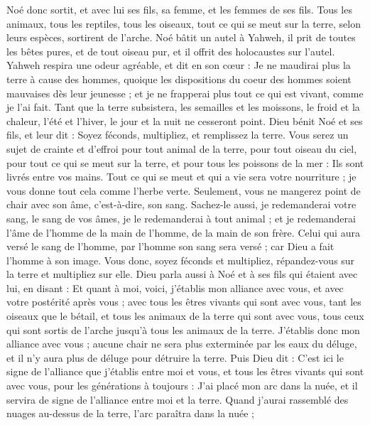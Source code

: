 \begin{multicols}{2}
Noé donc sortit, et avec lui ses fils, sa femme, et les femmes de ses fils.
Tous les animaux, tous les reptiles, tous les oiseaux, tout ce qui se meut sur la terre, selon leurs espèces, sortirent de l'arche.
Noé bâtit un autel à Yahweh, il prit de toutes les bêtes pures, et de tout oiseau pur, et il offrit des holocaustes sur l'autel.
Yahweh respira une odeur agréable, et dit en son cœur : Je ne maudirai plus la terre à cause des hommes, quoique les dispositions du coeur des hommes soient mauvaises dès leur jeunesse ; et je ne frapperai plus tout ce qui est vivant, comme je l’ai fait.
Tant que la terre subsistera, les semailles et les moissons, le froid et la chaleur, l'été et l'hiver, le jour et la nuit ne cesseront point.
\VerseOne{}Dieu bénit Noé et ses fils, et leur dit : Soyez féconds, multipliez, et remplissez la terre.
Vous serez un sujet de crainte et d’effroi pour tout animal de la terre, pour tout oiseau du ciel, pour tout ce qui se meut sur la terre, et pour tous les poissons de la mer : Ils sont livrés entre vos mains.
Tout ce qui se meut et qui a vie sera votre nourriture ; je vous donne tout cela comme l'herbe verte.
Seulement, vous ne mangerez point de chair avec son âme, c'est-à-dire, son sang.
Sachez-le aussi, je redemanderai votre sang, le sang de vos âmes, je le redemanderai à tout animal ; et je redemanderai l’âme de l’homme de la main de l’homme, de la main de son frère.
Celui qui aura versé le sang de l'homme, par l'homme son sang sera versé ; car Dieu a fait l'homme à son image.
Vous donc, soyez féconds et multipliez, répandez-vous sur la terre et multipliez sur elle.
Dieu parla aussi à Noé et à ses fils qui étaient avec lui, en disant :
Et quant à moi, voici, j'établis mon alliance avec vous, et avec votre postérité après vous ;
avec tous les êtres vivants qui sont avec vous, tant les oiseaux que le bétail, et tous les animaux de la terre qui sont avec vous, tous ceux qui sont sortis de l'arche jusqu'à tous les animaux de la terre.
J'établis donc mon alliance avec vous ; aucune chair ne sera plus exterminée par les eaux du déluge, et il n'y aura plus de déluge pour détruire la terre.
Puis Dieu dit : C'est ici le signe de l'alliance que j’établis entre moi et vous, et tous les êtres vivants qui sont avec vous, pour les générations à toujours :
J’ai placé mon arc dans la nuée, et il servira de signe de l'alliance entre moi et la terre.
Quand j’aurai rassemblé des nuages au-dessus de la terre, l’arc paraîtra dans la nuée ;

\end{multicols}
